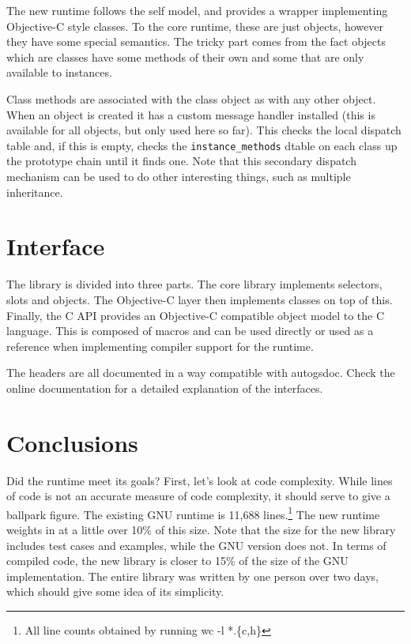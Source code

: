 \documentclass[10pt]{article}
\newcommand{\code}[1]{\lstinline|#1|}
\begin{document}
				The new runtime follows the self model, and provides a wrapper implementing Objective-C style classes.  To the core runtime, these are just objects, however they have some special semantics.  The tricky part comes from the fact objects which are classes have some methods of their own and some that are only available to instances.  

				Class methods are associated with the class object as with any other object.  When an object is created it has a custom message handler installed (this is available for all objects, but only used here so far).  This checks the local dispatch table and, if this is empty, checks the \code{instance_methods} dtable on each class up the prototype chain until it finds one.  Note that this secondary dispatch mechanism can be used to do other interesting things, such as multiple inheritance.

		\section{Interface}

			The library is divided into three parts.  The core library implements selectors, slots and objects.  The Objective-C layer then implements classes on top of this.  Finally, the C API provides an Objective-C compatible object model to the C language.  This is composed of macros and can be used directly or used as a reference when implementing compiler support for the runtime.

			The headers are all documented in a way compatible with autogsdoc.  Check the online documentation for a detailed explanation of the interfaces.

		\section{Conclusions}

			Did the runtime meet its goals?  First, let's look at code complexity.  While lines of code is not an accurate measure of code complexity, it should serve to give a ballpark figure.  The existing GNU runtime is 11,688 lines.\footnote{All line counts obtained by running wc -l *.\{c,h\}}  The new runtime weights in at a little over 10\% of this size.  Note that the size for the new library includes test cases and examples, while the GNU version does not.  In terms of compiled code, the new library is closer to 15\% of the size of the GNU implementation.  The entire library was written by one person over two days, which should give some idea of its simplicity.
			
\end{document}
